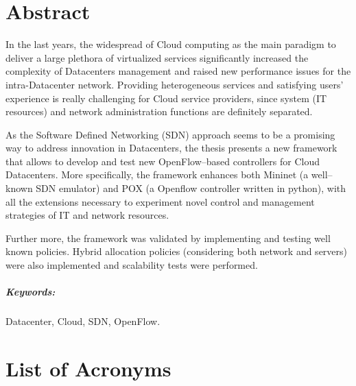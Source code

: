 \documentclass[12pt,english,oneside]{book}
\begin{document}



\chapter*{Abstract}


\begin{singlespace}
\hspace{0.6cm}
In the last years, the widespread of Cloud computing as the main paradigm to deliver a large plethora of virtualized services significantly increased the complexity of Datacenters management and raised new performance issues for the intra-Datacenter network.
Providing heterogeneous services and satisfying users' experience is really challenging for Cloud service providers, since system (IT resources) and network administration functions are definitely separated.

As the Software Defined Networking (SDN) approach seems to be a promising way to address innovation in Datacenters, the thesis presents a new framework that allows to develop and test new OpenFlow--based controllers for Cloud Datacenters.
More specifically, the framework enhances both Mininet (a well--known SDN emulator) and POX (a Openflow controller written in python), with all the extensions necessary to experiment novel control and management strategies of IT and network resources.

Further more, the framework was validated by implementing and testing well known policies.
Hybrid allocation policies (considering both network and servers) were also implemented and scalability tests were performed.

\end{singlespace}

\paragraph{Keywords:}
Datacenter, Cloud, SDN, OpenFlow.

\newpage

\tableofcontents{}

\clearpage

\chapter*{List of Acronyms}
\end{document}
